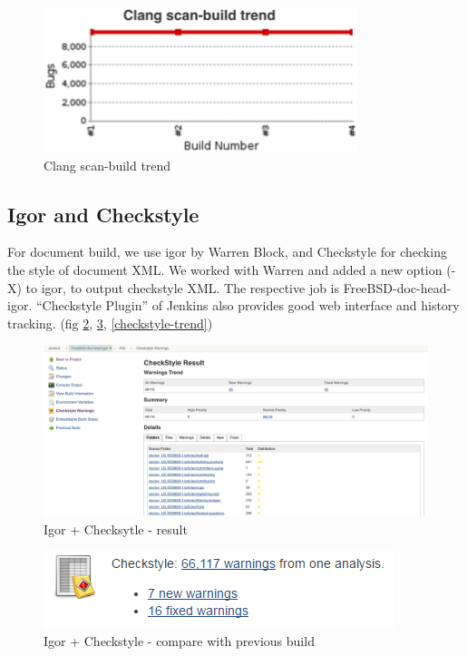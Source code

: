 \documentclass[a4paper,twocolumn,10pt]{article}
\begin{document}
\begin{figure}
\includegraphics{clang-scan-build-trend.png}
\caption{Clang scan-build trend}
\label{clang-scan-build-trend}
\end{figure}

\subsection{Igor and Checkstyle}

For document build, we use igor \cite{igor} by Warren Block, and Checkstyle
\cite{checkstyle} for checking the style of document XML. We worked with Warren
and added a new option (-X) to igor, to output checkstyle XML. The respective
job is FreeBSD-doc-head-igor.  ``Checkstyle Plugin''
\cite{jenkins-checkstyle-plugin} of Jenkins also provides good web interface
and history tracking. (fig \ref{checkstyle-result}, \ref{checkstyle-compare},
\ref{checkstyle-trend})

\begin{figure}
\includegraphics[width=\textwidth]{checkstyle-result.png}
\caption{Igor + Checksytle - result}
\label{checkstyle-result}
\end{figure}

\begin{figure}
\includegraphics{checkstyle-compare.png}
\caption{Igor + Checkstyle - compare with previous build}
\label{checkstyle-compare}
\end{figure}
\end{document}
